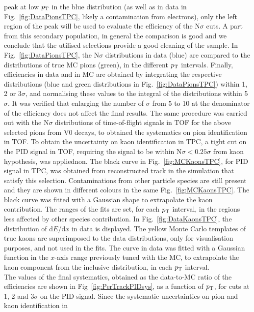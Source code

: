 peak at low $p_{\rm T}$ in
the blue distribution (as well as in data in Fig.~\ref{fig:DataPionsTPC}, likely a contamination from electrons), 
only the left region of the peak will be used 
to evaluate the efficiency of the N$\sigma$ cuts.
A part from this secondary population, in general the comparison is good and we
conclude that the utilised selections provide a good
cleaning of the sample. 
In Fig.~\ref{fig:DataPionsTPC}, the N$\sigma$ distributions in data (blue) are compared
to the distributions of true MC pions (green), in the different $p_{\rm T}$ intervals.  
Finally, efficiencies in data and in MC are obtained by integrating the respective 
distributions (blue and green distributions in Fig.~\ref{fig:DataPionsTPC})
within 1, 2 or 3$\sigma$, and normalising these values to the integral 
of the distributions within 5$\sigma$. It was verified that enlarging the number of $\sigma$ from 5 to 10 at the 
denominator of the efficiency does not affect the final results.
The same procedure
was carried out with the N$\sigma$ distributions of time-of-flight signals in TOF
for the above selected pions from V0 decays, to obtained the systematics on pion identification in TOF.
To obtain the uncertainty on kaon identification in TPC, a tight cut on the PID 
signal in TOF, requiring the signal to be within N$\sigma < 0.25\sigma$ from kaon hypothesis, was appliednon. 
The black curve in Fig.~\ref{fig:MCKaonsTPC}, for PID signal in TPC, was obtained
from reconstructed track in the simulation that satisfy this selection.
Contaminations from other particle species are still present and they
are shown in different colours in the same Fig.~\ref{fig:MCKaonsTPC}. 
The black curve was fitted with a Gaussian shape 
to extrapolate the kaon contribution. The ranges of the fits are set, for each $p_{\rm T}$ interval, in 
the regions less affected by other species contribution.
In Fig.~\ref{fig:DataKaonsTPC}, the distribution of d$E$/d$x$ in data is displayed. 
The yellow Monte Carlo templates of true 
kaons are superimposed to the data distributions, 
only for visualisation purposes, and not used in the fits. The curve in data
was fitted with a Gaussian function in the $x$-axis range previously tuned with the MC,
to extrapolate the kaon component from the inclusive distribution, in each $p_{\rm T}$ interval.\\
The values of the final systematics, obtained as the data-to-MC ratio
of the efficiencies are shown in Fig~\ref{fig:PerTrackPIDsys}, as a function of $p_{\rm T}$,
for cuts at 1, 2 and 3$\sigma$ on the PID signal. 
Since the systematic uncertainties on pion and kaon identification in 
